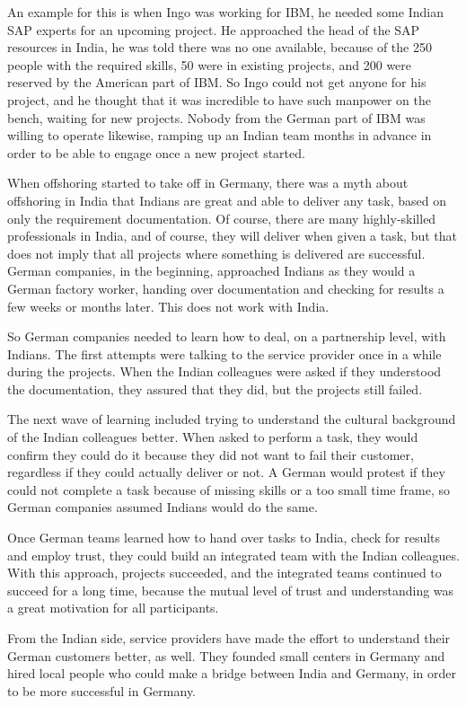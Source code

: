 An example for this is when Ingo was working for IBM, he needed some Indian SAP experts for an upcoming project. He approached the head of the SAP resources in India, he was told there was no one available, because of the 250 people with the required skills, 50 were in existing projects, and 200 were reserved by the American part of IBM. So Ingo could not get anyone for his project, and he thought that it was incredible to have such manpower on the bench, waiting for new projects. Nobody from the German part of IBM was willing to operate likewise, ramping up an Indian team months in advance in order to be able to engage once a new project started.


When offshoring started to take off in Germany, there was a myth about offshoring in India that Indians are great and able to deliver any task, based on only the requirement documentation. Of course, there are many highly-skilled professionals in India, and of course, they will deliver when given a task, but that does not imply that all projects where something is delivered are successful. German companies, in the beginning, approached Indians as they would a German factory worker, handing over documentation and checking for results a few weeks or months later. This does not work with India.

So German companies needed to learn how to deal, on a partnership level, with Indians. The first attempts were talking to the service provider once in a while during the projects. When the Indian colleagues were asked if they understood the documentation, they assured that they did, but the projects still failed.

The next wave of learning included trying to understand the cultural background of the Indian colleagues better. When asked to perform a task, they would confirm they could do it because they did not want to fail their customer, regardless if they could actually deliver or not. A German would protest if they could not complete a task because of missing skills or a too small time frame, so German companies assumed Indians would do the same.

Once German teams learned how to hand over tasks to India, check for results and employ trust, they could build an integrated team with the Indian colleagues. With this approach, projects succeeded, and the integrated teams continued to succeed for a long time, because the mutual level of trust and understanding was a great motivation for all participants.

From the Indian side, service providers have made the effort to understand their German customers better, as well. They founded small centers in Germany and hired local people who could make a bridge between India and Germany, in order to be more successful in Germany.

